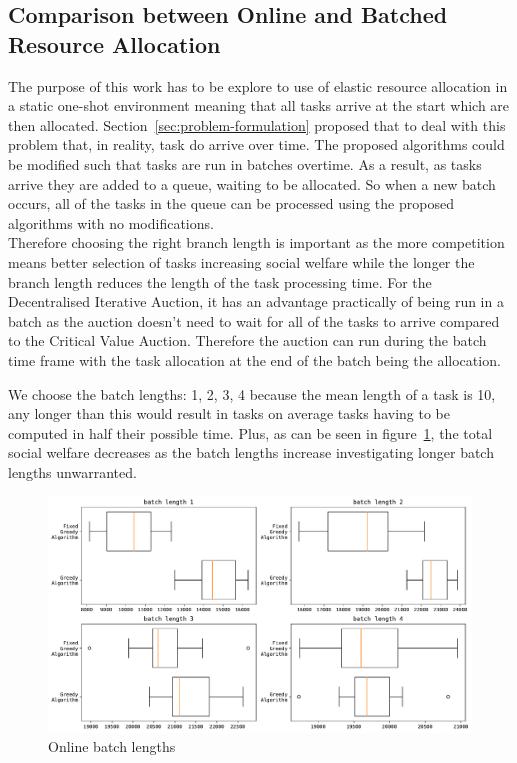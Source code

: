 \subsection{Comparison between Online and Batched Resource Allocation}
\label{subsec:comparison-between-online-and-batched-resource-allocation}
The purpose of this work has to be explore to use of elastic resource allocation in a static one-shot environment
meaning that all tasks arrive at the start which are then allocated. Section~\ref{sec:problem-formulation} proposed
that to deal with this problem that, in reality, task do arrive over time. The proposed algorithms could be modified
such that tasks are run in batches overtime. As a result, as tasks arrive they are added to a queue, waiting to be
allocated. So when a new batch occurs, all of the tasks in the queue can be processed using the proposed algorithms
with no modifications. \\
Therefore choosing the right branch length is important as the more competition means better selection of tasks
increasing social welfare while the longer the branch length reduces the length of the task processing time. For the
Decentralised Iterative Auction, it has an advantage practically of being run in a batch as the auction doesn't need to
wait for all of the tasks to arrive compared to the Critical Value Auction. Therefore the auction can run during the
batch time frame with the task allocation at the end of the batch being the allocation.

We choose the batch lengths: 1, 2, 3, 4 because the mean length of a task is 10, any longer than this would result in
tasks on average tasks having to be computed in half their possible time. Plus, as can be seen in
figure~\ref{fig:batch-task-allocation}, the total social welfare decreases as the batch lengths increase investigating
longer batch lengths unwarranted.

\begin{figure}
    \centering
    \includegraphics[width=\linewidth]{figs/online/online_batch_lengths.pdf}
    \caption{Online batch lengths}
    \label{fig:batch-task-allocation}
\end{figure}
